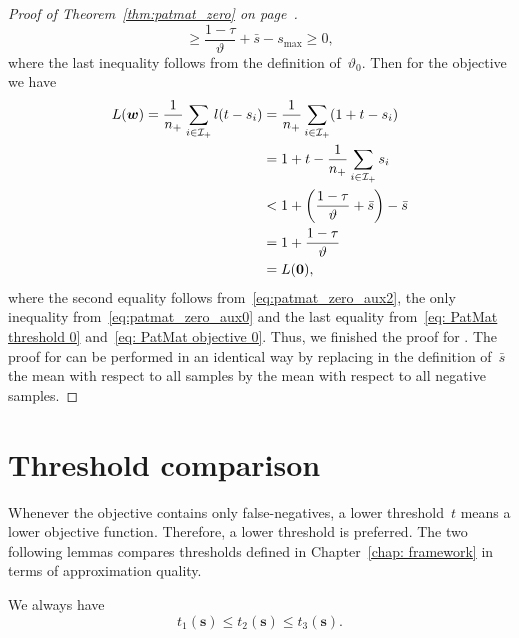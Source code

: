 \begin{proof}[Proof of Theorem~\ref{thm:patmat_zero} on page~\pageref{thm:patmat_zero}]
\begin{equation}
    \geq \frac{1-\tau}{\vartheta} + \bar{s} - s_{\max}
    \geq 0,
  \end{equation}
  where the last inequality follows from the definition of~$\vartheta_0$. Then for the objective we have
  \begin{equation*}
    \begin{aligned}
      L(\bm{w}) = \frac{1}{\npos}\sum_{i \in \Ipos}l(t-s_i)
      & = \frac{1}{\npos}\sum_{i \in \Ipos}\Brac{1+t-s_i} \\
      & = 1 + t - \frac{1}{\npos}\sum_{i \in \Ipos} s_i \\
      & < 1 + \Brac{\frac{1 - \tau}{\vartheta} + \bar{s}} - \bar{s} \\
      & = 1 + \frac{1-\tau}{\vartheta} \\
      & = L(\bm{0}),\\
    \end{aligned}
  \end{equation*}
  where the second equality follows from~\eqref{eq:patmat_zero_aux2}, the only inequality from~\eqref{eq:patmat_zero_aux0} and the last equality from~\eqref{eq: PatMat threshold 0} and~\eqref{eq: PatMat objective 0}. Thus, we finished the proof for \PatMat. The proof for \PatMatNP can be performed in an identical way by replacing in the definition of~$\bar{s}$ the mean with respect to all samples by the mean with respect to all negative samples.
\end{proof}

\section{Threshold comparison}\label{app:relations}

Whenever the objective contains only false-negatives, a lower threshold~$t$ means a lower objective function. Therefore, a lower threshold is preferred. The two following lemmas compares thresholds defined in Chapter~\ref{chap: framework} in terms of approximation quality.
\begin{lemma}\label{prop: threholds}
  We always have
  \begin{equation*}
    t_1(\bm{s}) \leq t_2(\bm{s}) \leq t_3(\bm{s}).
  \end{equation*}
\end{lemma}

\pagebreak

